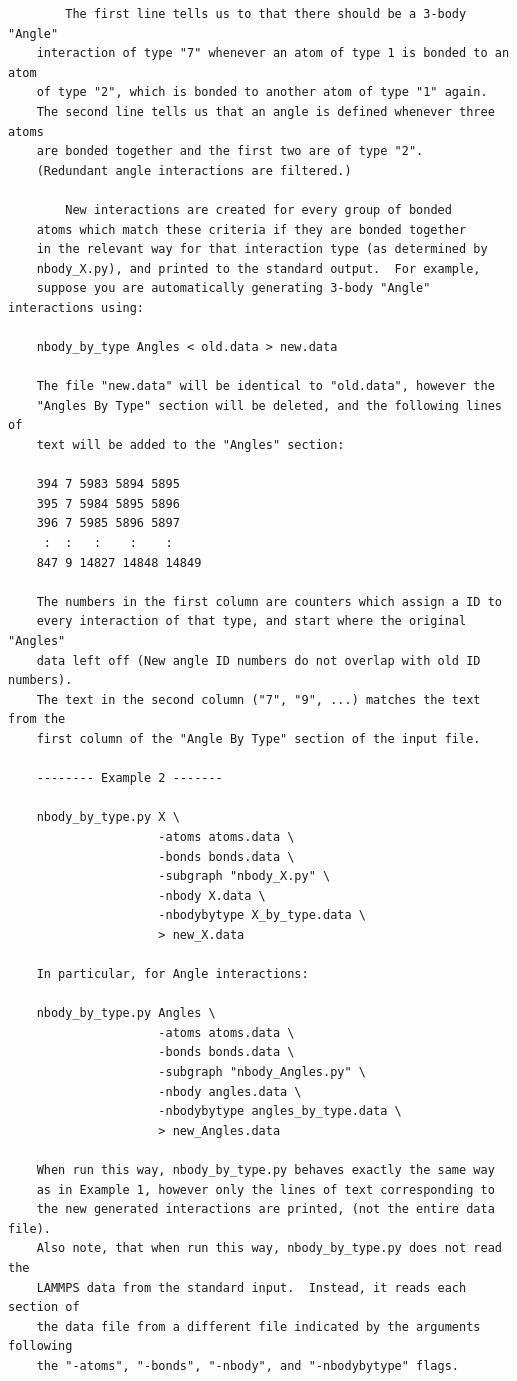\documentclass[11pt]{article}
\begin{document}
\begin{verbatim}
        The first line tells us to that there should be a 3-body "Angle" 
    interaction of type "7" whenever an atom of type 1 is bonded to an atom
    of type "2", which is bonded to another atom of type "1" again.
    The second line tells us that an angle is defined whenever three atoms 
    are bonded together and the first two are of type "2".
    (Redundant angle interactions are filtered.)

        New interactions are created for every group of bonded 
    atoms which match these criteria if they are bonded together 
    in the relevant way for that interaction type (as determined by
    nbody_X.py), and printed to the standard output.  For example, 
    suppose you are automatically generating 3-body "Angle" interactions using:

    nbody_by_type Angles < old.data > new.data

    The file "new.data" will be identical to "old.data", however the
    "Angles By Type" section will be deleted, and the following lines of
    text will be added to the "Angles" section:

    394 7 5983 5894 5895
    395 7 5984 5895 5896
    396 7 5985 5896 5897
     :  :   :    :    :
    847 9 14827 14848 14849

    The numbers in the first column are counters which assign a ID to 
    every interaction of that type, and start where the original "Angles"
    data left off (New angle ID numbers do not overlap with old ID numbers).
    The text in the second column ("7", "9", ...) matches the text from the 
    first column of the "Angle By Type" section of the input file.

    -------- Example 2 -------

    nbody_by_type.py X \
                     -atoms atoms.data \
                     -bonds bonds.data \
                     -subgraph "nbody_X.py" \
                     -nbody X.data \
                     -nbodybytype X_by_type.data \
                     > new_X.data

    In particular, for Angle interactions:

    nbody_by_type.py Angles \
                     -atoms atoms.data \
                     -bonds bonds.data \
                     -subgraph "nbody_Angles.py" \
                     -nbody angles.data \
                     -nbodybytype angles_by_type.data \
                     > new_Angles.data

    When run this way, nbody_by_type.py behaves exactly the same way
    as in Example 1, however only the lines of text corresponding to
    the new generated interactions are printed, (not the entire data file).
    Also note, that when run this way, nbody_by_type.py does not read the
    LAMMPS data from the standard input.  Instead, it reads each section of
    the data file from a different file indicated by the arguments following
    the "-atoms", "-bonds", "-nbody", and "-nbodybytype" flags.


\end{verbatim}
\end{document}
